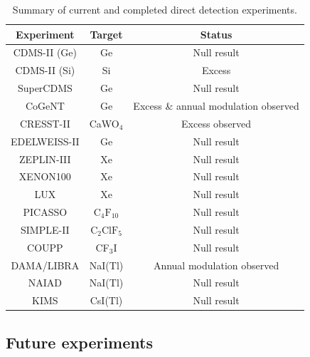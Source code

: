 

\begin{table}
	\begin{tabular}{ccc}
		\hline\hline
		Experiment & Target & Status \\
		\hline
		CDMS-II (Ge) \cite{Ahmed:2009,Ahmed:2011} & Ge & Null result \\
                CDMS-II (Si) \cite{Agnese:2013} & Si & Excess \\
                SuperCDMS \cite{Agnese:2014} & Ge & Null result \\
		CoGeNT \cite{Aalseth:2011a,Aalseth:2011b, Aalseth:2013,Aalseth:2014a,Aalseth:2014b} & Ge & Excess \& annual modulation observed \\
		CRESST-II \cite{Angloher:2012} & CaWO\(_4\) & Excess observed\\
		EDELWEISS-II \cite{Armengaud:2011} &  Ge & Null result \\
		ZEPLIN-III \cite{Akimov:2012} & Xe & Null result\\
		XENON100 \cite{Aprile:2011} & Xe & Null result \\
                LUX \cite{Akerib:2014} & Xe & Null result \\
		PICASSO \cite{Archambault:2012} & \(\textrm{C}_4\textrm{F}_{10}\) & Null result \\
		SIMPLE-II \cite{Felizardo:2012} & \(\textrm{C}_2 \textrm{ClF}_5\) & Null result \\
		COUPP \cite{Behnke:2011} & CF\(_3\)I & Null result \\
		DAMA/LIBRA \cite{Bernabei:2008a,Bernabei:2010,Bernabei:2013} &  NaI(Tl) & Annual modulation observed \\
                NAIAD \cite{Ahmed:2003} & NaI(Tl) & Null result \\
		KIMS \cite{Lee:2007} & CsI(Tl) & Null result \\
		\hline\hline
		\end{tabular}
	\caption{Summary of current and completed direct detection experiments.}
	\label{DD:tab:ExptSummary}
\end{table}




\subsection{Future experiments}

